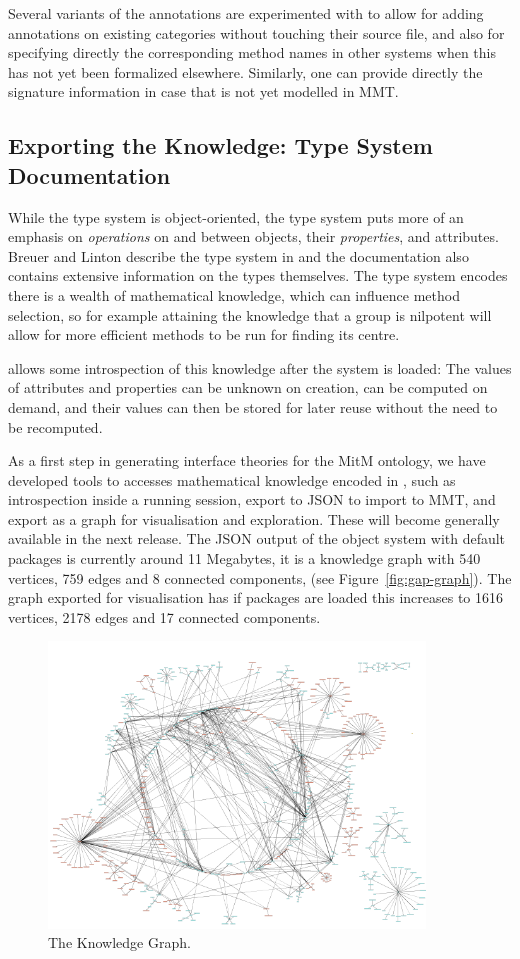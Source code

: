 Several variants of the annotations are experimented with to allow for adding annotations on existing
categories without touching their source file, and also for specifying directly the corresponding
method names in other systems when this has not yet been formalized elsewhere. Similarly,
one can provide directly the signature information in case that is not yet modelled in
MMT.

\subsection{Exporting the \GAP Knowledge: Type System Documentation}

While the \Sage type system is object-oriented, the \GAP type system puts more of an
emphasis on \emph{operations} on and between objects, their \emph{properties}, and
attributes. Breuer and Linton describe the \GAP type system in \cite{breuer-linton} and
the \GAP documentation \cite{GAP4} also contains extensive information on the types
themselves. The \GAP type system encodes \GAP there is a wealth of mathematical knowledge,
which can influence method selection, so for example attaining the knowledge that a group
is nilpotent will allow for more efficient methods to be run for finding its centre.

\GAP allows some introspection of this knowledge after the system is loaded: The values of
attributes and properties can be unknown on creation, can be computed on demand, and their
values can then be stored for later reuse without the need to be recomputed.

As a first step in generating interface theories for the MitM ontology, we have developed
tools to accesses mathematical knowledge encoded in \GAP, such as introspection inside a
running \GAP session, export to JSON to import to MMT, and export as a graph for
visualisation and exploration. These will become generally available in the next \GAP
release. The JSON output of the \GAP object system with default packages is currently
around 11 Megabytes, it is a knowledge graph with 540 vertices, 759 edges and 8 connected
components, (see Figure~\ref{fig:gap-graph}). The graph exported for visualisation has if
packages are loaded this increases to 1616 vertices, 2178 edges and 17 connected
components.

\begin{figure}[ht]\centering
  \includegraphics[width=10cm]{gap-graph}
  \caption{The \GAP Knowledge Graph.}
\end{figure}

